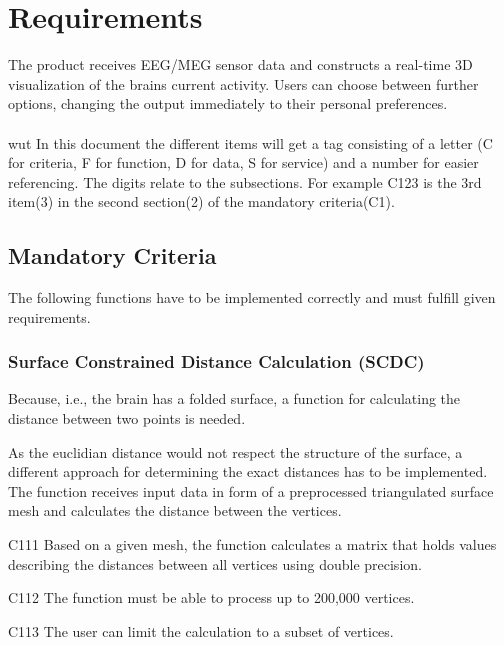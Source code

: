 \section{Requirements} 

	The product receives EEG/MEG sensor data and constructs a real-time 3D visualization of the brains current activity.
	Users can choose between further options, changing the output immediately to their personal preferences.
	\\\\wut
	In this document the different items will get a tag consisting of a letter (C for criteria, F for function, D for data, S for service) and a number for easier referencing. The digits relate to the subsections. For example C123 is the 3rd item(3) in the second section(2) of the mandatory criteria(C1).

\subsection{Mandatory Criteria}

	The following functions have to be implemented correctly and must fulfill given requirements.
		
\subsubsection{Surface Constrained Distance Calculation (SCDC)} \label{scdc}
	
	Because, i.e., the brain has a folded surface, a function for calculating the distance between two points is needed.
	
	As the euclidian distance would not respect the structure of the surface, a different approach for determining the exact 	distances has to be implemented.  
	The function receives input data in form of a preprocessed triangulated surface mesh and calculates the distance between 	the vertices.			
	
	
	\begin{aims}
	
		\item[C111] Based on a given mesh, the function calculates a matrix that holds values describing the distances between 						all vertices using double precision. 
		\item[C112] The function must be able to process up to 200,000 vertices.
		\item[C113] The user can limit the calculation to a subset of vertices. 
	
	\end{aims}

